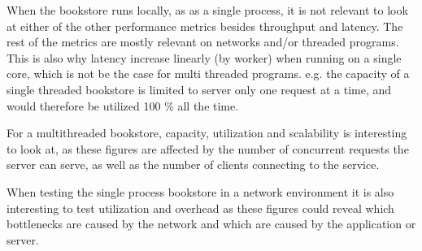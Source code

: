 \documentclass[a4paper, 11pt]{article}
\begin{document}
When the bookstore runs locally, as as a single process, it is not 
relevant to look at either of the other performance metrics besides throughput
and latency. The rest of the metrics are mostly relevant on networks and/or
threaded programs. This is also why latency increase linearly (by worker) when
running on a single core, which is not be the case for multi threaded programs.
e.g. the capacity of a single threaded bookstore is limited to server only one
request at a time, and would therefore be utilized 100 \% all the time.

For a multithreaded bookstore, capacity, utilization and scalability is
interesting to look at, as these figures are affected by the number of
concurrent requests the server can serve, as well as the number of clients
connecting to the service.

When testing the single process bookstore in a network environment it is also
interesting to test utilization and overhead as these figures could reveal
which bottlenecks are caused by the network and which are caused by the
application or server.


\end{document}
